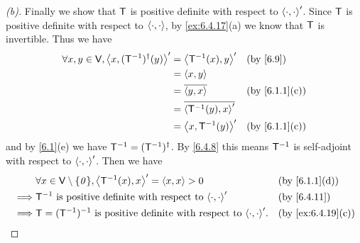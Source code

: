 \begin{proof}[(b)]
  Finally we show that \(\mathsf{T}\) is positive definite with respect to \(\left\langle\cdot, \cdot\right\rangle'\).
  Since \(\mathsf{T}\) is positive definite with respect to \(\left\langle\cdot, \cdot\right\rangle\), by \cref{ex:6.4.17}(a) we know that \(\mathsf{T}\) is invertible.
  Thus we have
  \begin{align*}
    \forall x, y \in \V, \inn{x, (\T^{-1})^{\dag}(y)}' & = \inn{\T^{-1}(x), y}'        &  & \text{(by \cref{6.9})}      \\
                                                       & = \inn{x, y}                                                   \\
                                                       & = \conj{\inn{y, x}}           &  & \text{(by \cref{6.1.1}(c))} \\
                                                       & = \conj{\inn{\T^{-1}(y), x}'}                                  \\
                                                       & = \inn{x, \T^{-1}(y)}'        &  & \text{(by \cref{6.1.1}(c))}
  \end{align*}
  and by \cref{6.1}(e) we have \(\mathsf{T}^{-1} = (\mathsf{T}^{-1})^{\dag}\).
  By \cref{6.4.8} this means \(\mathsf{T}^{-1}\) is self-adjoint with respect to \(\left\langle\cdot, \cdot\right\rangle'\).
  Then we have
  \begin{align*}
             & \forall x \in \V \setminus \set{\zv}, \inn{\T^{-1}(x), x}' = \inn{x, x} > 0            &  & \text{(by \cref{6.1.1}(d))}     \\
    \implies & \T^{-1} \text{ is positive definite with respect to } \inn{\cdot, \cdot}'              &  & \text{(by \cref{6.4.11})}       \\
    \implies & \T = (\T^{-1})^{-1} \text{ is positive definite with respect to } \inn{\cdot, \cdot}'. &  & \text{(by \cref{ex:6.4.19}(c))}
  \end{align*}
\end{proof}
